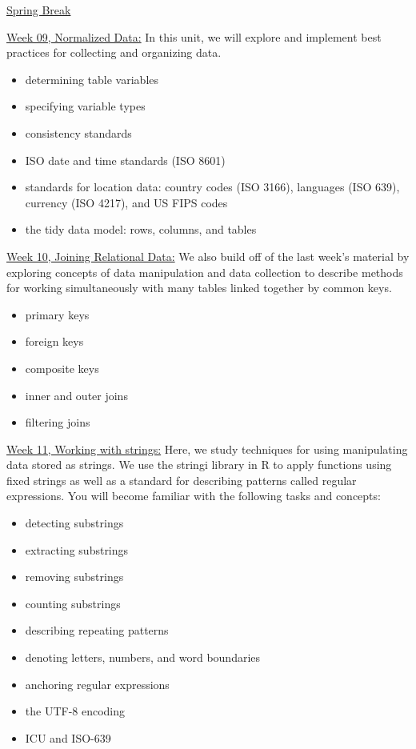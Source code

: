 \documentclass[12pt]{article}
\begin{document}
\bigskip

\underline{Spring Break}

\bigskip

\underline{Week 09, Normalized Data:}
In this unit, we will explore and implement best practices for collecting and
organizing data.
\begin{itemize}\setlength\itemsep{0em}
\item
  determining table variables
\item
  specifying variable types
\item
  consistency standards
\item
  ISO date and time standards (ISO 8601)
\item
  standards for location data: country codes (ISO 3166), languages (ISO
  639), currency (ISO 4217), and US FIPS codes
\item
  the tidy data model: rows, columns, and tables
\end{itemize}

\bigskip

\underline{Week 10, Joining Relational Data:}
We also build off of the last week's material by exploring
concepts of data manipulation and data
collection to describe methods for working simultaneously with many
tables linked together by common keys.
\begin{itemize}\setlength\itemsep{0em}
\item
  primary keys
\item
  foreign keys
\item
  composite keys
\item
  inner and outer joins
\item
  filtering joins
\end{itemize}

\bigskip

\underline{Week 11, Working with strings:}
Here, we study techniques for using manipulating data stored as strings. We use the stringi library in R to apply functions using fixed strings as well as a standard for describing patterns called regular expressions. You will become familiar with the following tasks and concepts:
\begin{itemize}\setlength\itemsep{0em}
\item detecting substrings
\item extracting substrings
\item removing substrings
\item counting substrings
\item describing repeating patterns
\item denoting letters, numbers, and word boundaries
\item anchoring regular expressions
\item the UTF-8 encoding
\item ICU and ISO-639
\end{itemize}
\end{document}

